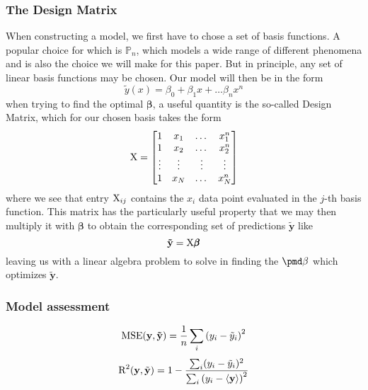 \documentclass[reprint, english, nofootinbib]{revtex4-2}
\begin{document}
        \subsubsection{The Design Matrix}
            \noindent
            When constructing a model, we first have to chose a set of basis functions. A popular choice for which is $\mathbb P_n$, which models a wide range of different phenomena and is also the choice we will make for this paper. But in principle, any set of linear basis functions may be chosen.
            Our model will then be in the form
            \begin{equation}
                \tilde y (x) = \beta_0 + \beta_1 x + \dots \beta_n x^n
            \end{equation}
            when trying to find the optimal $\pmb \beta$, a useful quantity is the so-called Design Matrix, which for our chosen basis takes the form
            \begin{equation}
                \textup{X} = \qty[
                \begin{matrix}
                    1 & x_1 & \dots & x_1^n \\
                    1 & x_2 & \dots & x_2^n \\
                    \vdots & \vdots & \vdots & \vdots \\
                    1 & x_N & \dots & x_N^n
                \end{matrix}
                ]
            \end{equation}
            where we see that entry $\textup{X}_{ij}$ contains the $x_i$ data point evaluated in the $j$-th basis function. This matrix has the particularly useful property that we may then multiply it with $\pmb \beta$ to obtain the corresponding set of predictions $\mathbf{\tilde y}$ like
            \begin{equation}
                \mathbf{\tilde y} = \textup{X}\pmb \beta
            \end{equation}
            leaving us with a linear algebra problem to solve in finding the $\pmd\beta$ which optimizes $\mathbf{\tilde y}$.

        \subsubsection{Model assessment}

        \begin{equation}
            \textup{MSE}(\mathbf y, \mathbf{\tilde y}) = \frac{1}{n}\sum_i \qty(y_i - \tilde y_i)^2
        \end{equation}
        \begin{equation}
            \textup{R}^2(\mathbf y, \tilde{\mathbf{y}}) = 1 -
            \frac{\sum_i(y_i - \tilde y_i)^2}{\sum_i \qty(y_i - \langle \mathbf y\rangle)^2}
        \end{equation}
\end{document}

